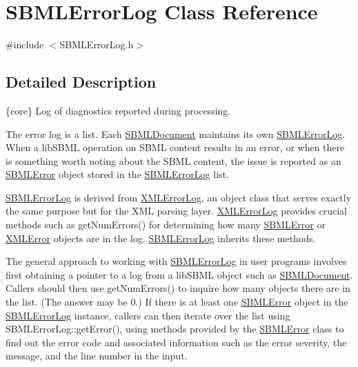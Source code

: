 \hypertarget{class_s_b_m_l_error_log}{}\section{S\+B\+M\+L\+Error\+Log Class Reference}
\label{class_s_b_m_l_error_log}


{\ttfamily \#include $<$S\+B\+M\+L\+Error\+Log.\+h$>$}



\subsection{Detailed Description}
\{core\} Log of diagnostics reported during processing.



The error log is a list. Each \hyperlink{class_s_b_m_l_document}{S\+B\+M\+L\+Document} maintains its own \hyperlink{class_s_b_m_l_error_log}{S\+B\+M\+L\+Error\+Log}. When a lib\+S\+B\+ML operation on S\+B\+ML content results in an error, or when there is something worth noting about the S\+B\+ML content, the issue is reported as an \hyperlink{class_s_b_m_l_error}{S\+B\+M\+L\+Error} object stored in the \hyperlink{class_s_b_m_l_error_log}{S\+B\+M\+L\+Error\+Log} list.

\hyperlink{class_s_b_m_l_error_log}{S\+B\+M\+L\+Error\+Log} is derived from \hyperlink{class_x_m_l_error_log}{X\+M\+L\+Error\+Log}, an object class that serves exactly the same purpose but for the X\+ML parsing layer. \hyperlink{class_x_m_l_error_log}{X\+M\+L\+Error\+Log} provides crucial methods such as get\+Num\+Errors() for determining how many \hyperlink{class_s_b_m_l_error}{S\+B\+M\+L\+Error} or \hyperlink{class_x_m_l_error}{X\+M\+L\+Error} objects are in the log. \hyperlink{class_s_b_m_l_error_log}{S\+B\+M\+L\+Error\+Log} inherits these methods.

The general approach to working with \hyperlink{class_s_b_m_l_error_log}{S\+B\+M\+L\+Error\+Log} in user programs involves first obtaining a pointer to a log from a lib\+S\+B\+ML object such as \hyperlink{class_s_b_m_l_document}{S\+B\+M\+L\+Document}. Callers should then use get\+Num\+Errors() to inquire how many objects there are in the list. (The answer may be 0.) If there is at least one \hyperlink{class_s_b_m_l_error}{S\+B\+M\+L\+Error} object in the \hyperlink{class_s_b_m_l_error_log}{S\+B\+M\+L\+Error\+Log} instance, callers can then iterate over the list using S\+B\+M\+L\+Error\+Log\+::get\+Error(), using methods provided by the \hyperlink{class_s_b_m_l_error}{S\+B\+M\+L\+Error} class to find out the error code and associated information such as the error severity, the message, and the line number in the input.

